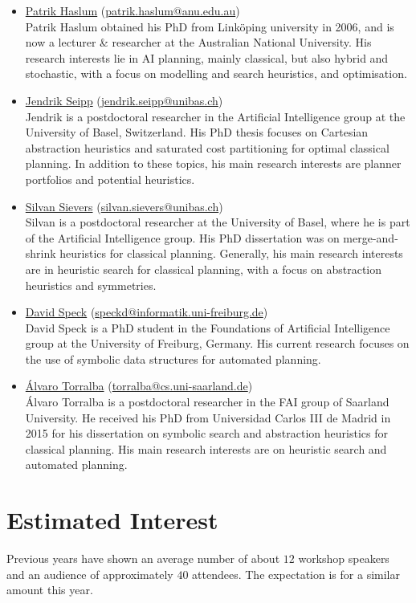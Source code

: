 \documentclass[10pt]{article}
\begin{document}
\begin{itemize}
\item \href{https://users.cecs.anu.edu.au/~patrik/}{Patrik Haslum}
(\href{mailto:patrik.haslum@anu.edu.au}{patrik.haslum@anu.edu.au})\\
Patrik Haslum obtained his PhD from Link\"oping university in 2006,
and is now a lecturer \& researcher at the Australian National
University. His research interests lie in AI planning, mainly classical,
but also hybrid and stochastic, with a focus on modelling and search
heuristics, and optimisation.

\item \href{https://ai.dmi.unibas.ch/people/seipp}{Jendrik Seipp}
(\href{mailto:jendrik.seipp@unibas.ch}{jendrik.seipp@unibas.ch})\\
Jendrik is a postdoctoral researcher in the Artificial Intelligence
group at the University of Basel, Switzerland. His PhD thesis focuses
on Cartesian abstraction heuristics and saturated cost partitioning
for optimal classical planning. In addition to these topics, his main
research interests are planner portfolios and potential heuristics.

\item \href{https://ai.dmi.unibas.ch/people/sieverss}{Silvan Sievers}
(\href{mailto:silvan.sievers@unibas.ch}{silvan.sievers@unibas.ch})\\
Silvan is a postdoctoral researcher at the University of Basel, where he is
part of the Artificial Intelligence group. His PhD dissertation was on
merge-and-shrink heuristics for classical planning. Generally, his main
research interests are in heuristic search for classical planning, with a focus
on abstraction heuristics and symmetries.

\item \href{http://www.informatik.uni-freiburg.de/~speckd/}{David Speck}
(\href{mailto:speckd@informatik.uni-freiburg.de}{speckd@informatik.uni-freiburg.de})\\
David Speck is a PhD student in the Foundations of Artificial Intelligence
group at the University of Freiburg, Germany. His current research focuses on
the use of symbolic data structures for automated planning.

\item \href{https://fai.cs.uni-saarland.de/torralba/}{{\'A}lvaro Torralba}
  (\href{mailto:torralba@cs.uni-saarland.de}{torralba@cs.uni-saarland.de})\\ \'Alvaro
  Torralba is a postdoctoral researcher in the FAI group of Saarland University. He
  received his PhD from Universidad Carlos III de Madrid in 2015 for his dissertation on
  symbolic search and abstraction heuristics for classical planning. His main research
  interests are on heuristic search and automated planning.


\end{itemize}

\section*{Estimated Interest}
Previous years have shown an average number of about $12$ workshop
speakers and an audience of approximately $40$ attendees. The
expectation is for a similar amount this year.
\end{document}
